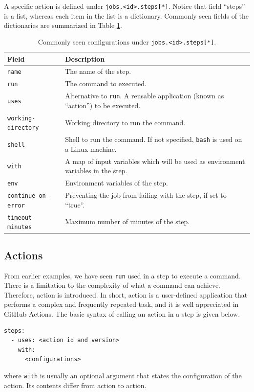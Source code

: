 A specific action is defined under \texttt{jobs.<id>.steps[*]}. Notice that field ``steps'' is a list, whereas each item in the list is a dictionary. Commonly seen fields of the dictionaries are summarized in Table \ref{tab:githubactions_steps}.
\begin{table}[!htb]
	\centering \caption{Commonly seen configurations under \texttt{jobs.<id>.steps[*]}.}\label{tab:githubactions_steps}
	\begin{tabularx}{\textwidth}{lX}
		\hline
		Field & Description \\ \hline
		\texttt{name} & The name of the step. \\ 
        \texttt{run} & The command to executed. \\
        \texttt{uses} & Alternative to \texttt{run}. A reusable application (known as ``action'') to be executed. \\
        \texttt{working-directory} & Working directory to run the command. \\
        \texttt{shell} & Shell to run the command. If not specified, \texttt{bash} is used on a Linux machine. \\
        \texttt{with} & A map of input variables which will be used as environment variables in the step. \\
        \texttt{env} & Environment variables of the step. \\
        \texttt{continue-on-error} & Preventing the job from failing with the step, if set to ``true''. \\
        \texttt{timeout-minutes} & Maximum number of minutes of the step. \\
		\hline
	\end{tabularx}
\end{table}

\subsection{Actions}

From earlier examples, we have seen \verb|run| used in a step to execute a command. There is a limitation to the complexity of what a command can achieve. Therefore, action is introduced. In short, action is a user-defined application that performs a complex and frequently repeated task, and it is well appreciated in GitHub Actions. The basic syntax of calling an action in a step is given below.
\begin{lstlisting}
steps:
  - uses: <action id and version>
    with:
      <configurations>    
\end{lstlisting}
where \verb|with| is usually an optional argument that states the configuration of the action. Its contents differ from action to action.

